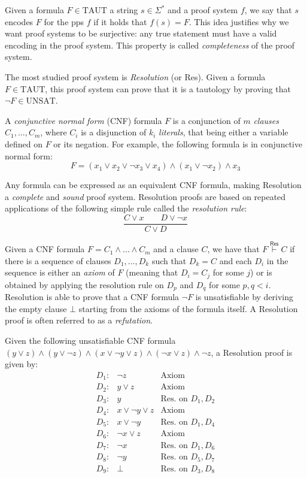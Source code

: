 Given a formula $F \in \mathrm{TAUT}$ a string $s \in \Sigma^*$ and a proof system $f$, we say that $s$ encodes $F$ for the pps $f$ if it holds that $f(s) = F$. This idea justifies why we want proof systems to be surjective: any true statement must have a valid encoding in the proof system. This property is called \textit{completeness} of the proof system.

The most studied proof system is \textit{Resolution} (or \textsf{Res}). Given a formula $F \in \mathrm{TAUT}$, this proof system can prove that it is a tautology by proving that $\lnot F \in \mathrm{UNSAT}$.

A \textit{conjunctive normal form} (CNF) formula $F$ is a conjunction of $m$ \textit{clauses} $C_1, \ldots, C_m$, where $C_i$ is a disjunction of $k_i$ \textit{literals}, that being either a variable defined on $F$ or its negation. For example, the following formula is in conjunctive normal form:
\[F = (x_1 \lor x_2 \lor \lnot{x_3} \lor x_4) \land (x_1 \lor \lnot{x_2}) \land x_3\]

Any formula can be expressed as an equivalent CNF formula, making Resolution a \textit{complete} and \textit{sound} proof system. Resolution proofs are based on repeated applications of the following simple rule called the \textit{resolution rule}:
\[\dfrac{C \lor x \qquad D \lor \lnot x}{C \lor D}\]

Given a CNF formula $F = C_1 \land \ldots \land C_m$ and a clause $C$, we have that $F \stackrel{\mathsf{Res}}{\vdash} C$ if there is a sequence of clauses $D_1, \ldots, D_k$ such that $D_k = C$ and each $D_i$ in the sequence is either an \textit{axiom} of $F$ (meaning that $D_i = C_j$ for some $j$) or is obtained by applying the resolution rule on $D_p$ and $D_q$ for some $p,q < i$. Resolution is able to prove that a CNF formula $\lnot F$ is unsatisfiable by deriving the empty clause $\bot$ starting from the axioms of the formula itself. A Resolution proof is often referred to as a \textit{refutation}.

Given the following unsatisfiable CNF formula $(y \lor z) \land (y \lor \lnot{z}) \land (x \lor \lnot{y} \lor z) \land (\lnot{x} \lor z) \land \lnot{z}$, a Resolution proof is given by:
\[\begin{array}{lcl}
 D_1 :& \lnot{z} & \text{Axiom} \\
 D_2 :& y \lor z & \text{Axiom} \\
 D_3 :& y & \text{Res. on $D_1, D_2$} \\
 D_4 :& x \lor \lnot{y} \lor z  & \text{Axiom} \\
 D_5 :& x \lor \lnot{y} & \text{Res. on $D_1, D_4$} \\
 D_6 :& \lnot{x} \lor z & \text{Axiom} \\
 D_7 :& \lnot{x} & \text{Res. on $D_1, D_6$} \\
 D_8 :& \lnot{y} & \text{Res. on $D_5, D_7$} \\
 D_9 :& \bot & \text{Res. on $D_3, D_8$} \\
\end{array}\]

